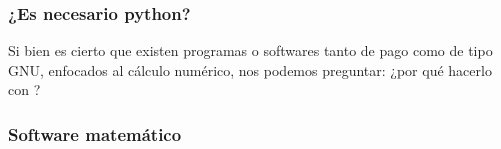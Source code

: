 \documentclass[12pt]{beamer}
\begin{document}
\begin{frame}
\frametitle{¿Es necesario python?}
Si bien es cierto que existen programas o softwares tanto de pago como de tipo GNU, enfocados al cálculo numérico, \pause nos podemos preguntar: ¿por qué hacerlo con \python?
\end{frame}
\begin{frame}
\frametitle{Software matemático}
\begin{figure}
    \centering

\end{figure}
\end{frame}
\end{document}
